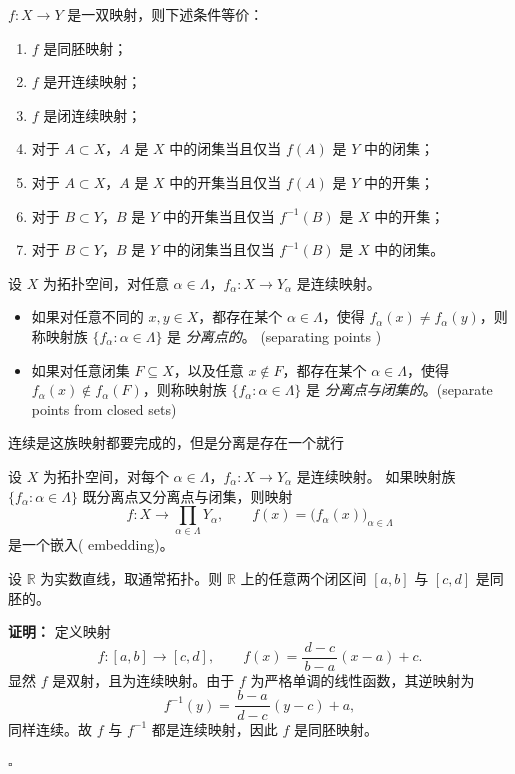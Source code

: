 \begin{theorem}
$f : X \to Y$ 是一双映射，则下述条件等价：
\begin{enumerate}
    \item $f$ 是同胚映射；
    \item $f$ 是开连续映射；
    \item $f$ 是闭连续映射；
    \item 对于 $A \subset X$，$A$ 是 $X$ 中的闭集当且仅当 $f(A)$ 是 $Y$ 中的闭集；
    \item 对于 $A \subset X$，$A$ 是 $X$ 中的开集当且仅当 $f(A)$ 是 $Y$ 中的开集；
    \item 对于 $B \subset Y$，$B$ 是 $Y$ 中的开集当且仅当 $f^{-1}(B)$ 是 $X$ 中的开集；
    \item 对于 $B \subset Y$，$B$ 是 $Y$ 中的闭集当且仅当 $f^{-1}(B)$ 是 $X$ 中的闭集。
\end{enumerate}
\end{theorem}
\begin{definition}
设 $X$ 为拓扑空间，对任意 $\alpha \in \Lambda$，$f_\alpha : X \to Y_\alpha$ 是连续映射。

\begin{itemize}
    \item 如果对任意不同的 $x,y \in X$，都存在某个 $\alpha \in \Lambda$，使得 $f_\alpha(x) \ne f_\alpha(y)$，则称映射族 $\{f_\alpha : \alpha \in \Lambda\}$ 是 \emph{分离点的}。
(separating points )
    \item 如果对任意闭集 $F \subseteq X$，以及任意 $x \notin F$，都存在某个 $\alpha \in \Lambda$，使得 $f_\alpha(x) \notin f_\alpha(F)$，则称映射族 $\{f_\alpha : \alpha \in \Lambda\}$ 是 \emph{分离点与闭集的}。(separate points from closed sets)
\end{itemize}
\end{definition}
\begin{note}
    连续是这族映射都要完成的，但是分离是存在一个就行
\end{note}
\begin{theorem}[嵌入=分离点+分离点与闭集]
设 $X$ 为拓扑空间，对每个 $\alpha \in \Lambda$，$f_\alpha : X \to Y_\alpha$ 是连续映射。
如果映射族 $\{f_\alpha : \alpha \in \Lambda\}$ 既分离点又分离点与闭集，则映射
\[
f : X \to \prod_{\alpha \in \Lambda} Y_\alpha, \qquad
f(x) = \bigl(f_\alpha(x)\bigr)_{\alpha \in \Lambda}
\]
是一个嵌入( embedding)。
\end{theorem}
\begin{example}[任意两个闭区间同胚]
设 $\mathbb{R}$ 为实数直线，取通常拓扑。则 $\mathbb{R}$ 上的任意两个闭区间 $[a,b]$ 与 $[c,d]$ 是同胚的。

\textbf{证明：}
定义映射
\[
f : [a,b] \to [c,d], \qquad
f(x) = \frac{d-c}{\,b-a\,}(x-a) + c.
\]
显然 $f$ 是双射，且为连续映射。由于 $f$ 为严格单调的线性函数，其逆映射为
\[
f^{-1}(y) = \frac{b-a}{\,d-c\,}(y-c) + a,
\]
同样连续。故 $f$ 与 $f^{-1}$ 都是连续映射，因此 $f$ 是同胚映射。

\hfill $\square$
\end{example}